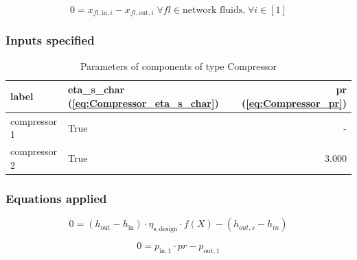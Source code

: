 \begin{equation}
\label{eq:Compressor_fluid_constraints}
0=x_{fl\mathrm{,in,}i}-x_{fl\mathrm{,out,}i}\;\forall fl \in\text{network fluids,}\; \forall i \in [1]
\end{equation}


\subsubsection{Inputs specified}

\begin{table}[H]\begin{center}
\begin{tabular}{llr}
\toprule
        label &  eta\_s\_char (\ref{eq:Compressor_eta_s_char}) &  pr (\ref{eq:Compressor_pr}) \\
\midrule
 compressor 1 &                                           True &                            - \\
 compressor 2 &                                           True &                        3.000 \\
\bottomrule
\end{tabular}
\caption{Parameters of components of type Compressor}
\end{center}\end{table}

\subsubsection{Equations applied}

\begin{equation}
\label{eq:Compressor_eta_s_char}
0=\left(h_\mathrm{out}-h_\mathrm{in}\right)\cdot\eta_\mathrm{s,design}\cdot f\left(X\right)-\left( h_{out,s} - h_{in} \right)
\end{equation}

\begin{equation}
\label{eq:Compressor_pr}
0=p_\mathrm{in,1}\cdot pr - p_\mathrm{out,1}
\end{equation}

